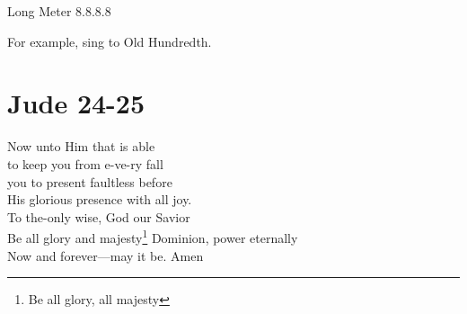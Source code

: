\documentclass{article}
\begin{document}
\noindent Long Meter 8.8.8.8

\noindent For example, sing to Old Hundredth.

\section*{Jude 24-25}

 Now unto Him that is able\\
to keep you from e-ve-ry fall\\
you to present faultless before\\
His glorious presence with all joy.\\

 To the-only wise, God our Savior\\
Be all glory and majesty\footnote{Be all glory, all majesty}
Dominion, power eternally\\
Now and forever---may it be. Amen\\
\end{document}
